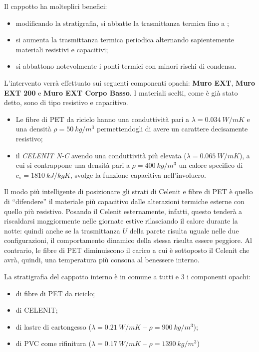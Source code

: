 Il cappotto ha molteplici benefici:
\begin{itemize}
	\item modificando la stratigrafia, si abbatte la trasmittanza termica fino a ;
	\item si aumenta la trasmittanza termica periodica alternando sapientemente materiali resistivi e capacitivi;
	\item si abbattono notevolmente i ponti termici con minori rischi di condensa.
\end{itemize}
L'intervento verrà effettuato sui seguenti componenti opachi: \textbf{Muro EXT}, \textbf{Muro EXT 200} e \textbf{Muro EXT Corpo Basso}. I materiali scelti, come è già stato detto, sono di tipo resistivo e capacitivo.
\begin{itemize}
	\item Le fibre di PET da riciclo hanno una conduttività pari a $\lambda=\SI{0.034}{W/mK}$ e una densità $\rho=\SI{50}{kg/m^3}$ permettendogli di avere un carattere decisamente resistivo;
	\item il \emph{CELENIT N-C} avendo una conduttività più elevata ($\lambda=\SI{0.065}{W/mK}$), a cui si contrappone una densità pari a $\rho=\SI{400}{kg/m^3}$ un calore specifico di $c_s=\SI{1810}{kJ/kgK}$, svolge la funzione capacitiva nell'involucro.
\end{itemize}
Il modo più intelligente di posizionare gli strati di Celenit e fibre di PET è quello di ``difendere'' il materiale più capacitivo dalle alterazioni termiche esterne con quello più resistivo. Posando il Celenit esternamente, infatti, questo tenderà a riscaldarsi maggiormente nelle giornate estive rilasciando il calore durante la notte: quindi anche se la trasmittanza $U$ della parete risulta uguale nelle due configurazioni, il comportamento dinamico della stessa risulta essere peggiore. Al contrario, le fibre di PET diminuiscono il carico a cui è sottoposto il Celenit che avrà, quindi, una temperatura più consona al benessere interno.

La stratigrafia del cappotto interno è in comune a tutti e 3 i componenti opachi:
\begin{itemize}
	\item {} di fibre di PET da riciclo;
	\item {} di CELENIT;
	\item {} di lastre di cartongesso ($\lambda=\SI{0.21}{W/mK}$ -- $\rho=\SI{900}{kg/m^3}$);
	\item {} di PVC come rifinitura ($\lambda=\SI{0.17}{W/mK}$ -- $\rho=\SI{1390}{kg/m^3}$)
\end{itemize}

